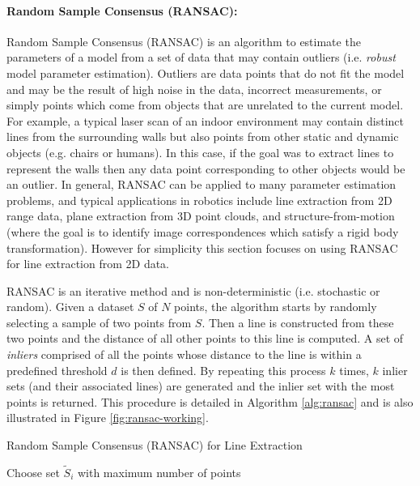 \paragraph{Random Sample Consensus (RANSAC):}
Random Sample Consensus (RANSAC) is an algorithm to estimate the parameters of a model from a set of data that may contain outliers (i.e. \textit{robust} model parameter estimation). Outliers are data points that do not fit the model and may be the result of high noise in the data, incorrect measurements, or simply points which come from objects that are unrelated to the current model. For example, a typical laser scan of an indoor environment may contain distinct lines from the surrounding walls but also points from other static and dynamic objects (e.g. chairs or humans). In this case, if the goal was to extract lines to represent the walls then any data point corresponding to other objects would be an outlier. In general, RANSAC can be applied to many parameter estimation problems, and typical applications in robotics include line extraction from 2D range data, plane extraction from 3D point clouds, and structure-from-motion (where the goal is to identify image correspondences which satisfy a rigid body transformation). However for simplicity this section focuses on using RANSAC for line extraction from 2D data.

RANSAC is an iterative method and is non-deterministic (i.e. stochastic or random). 
Given a dataset $S$ of $N$ points, the algorithm starts by randomly selecting a sample of two points from $S$. Then a line is constructed from these two points and the distance of all other points to this line is computed. A set of \textit{inliers} comprised of all the points whose distance to the line is within a predefined threshold $d$ is then defined. By repeating this process $k$ times, $k$ inlier sets (and their associated lines) are generated and the inlier set with the most points is returned. This procedure is detailed in Algorithm \ref{alg:ransac} and is also illustrated in Figure \ref{fig:ransac-working}.
\begin{algorithm}[ht]\caption{Random Sample Consensus (RANSAC) for Line Extraction} \label{alg:ransac}
	Choose set $\tilde{S}_i$ with maximum number of points
\end{algorithm}


